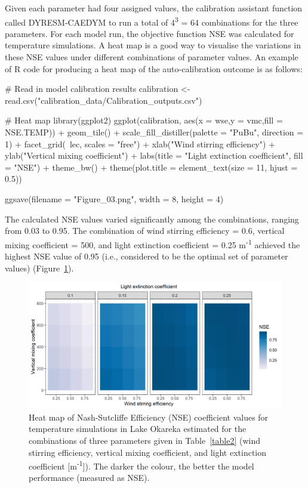 Given each parameter had four assigned values, the calibration assistant function called DYRESM-CAEDYM to run a total of 4\textsuperscript{3} = 64 combinations for the three parameters. For each model run, the objective function NSE was calculated for temperature simulations. A heat map is a good way to visualise the variations in these NSE values under different combinations of parameter values. An example of R code for producing a heat map of the auto-calibration outcome is as follows:

\begin{example}
    # Read in model calibration results
    calibration <- read.csv("calibration_data/Calibration_outputs.csv")

    # Heat map
    library(ggplot2)
    ggplot(calibration, aes(x = wse,y = vmc,fill = NSE.TEMP)) +
           geom_tile() +
           scale_fill_distiller(palette = "PuBu", direction = 1) +
           facet_grid(~lec, scales = "free") +
           xlab("Wind stirring efficiency") +
           ylab("Vertical mixing coefficient") +
           labs(title = "Light extinction coefficient", fill = "NSE") +
           theme_bw()  +
           theme(plot.title = element_text(size = 11, hjust = 0.5))
           
    ggsave(filename = "Figure_03.png", width = 8, height = 4)
\end{example}

The calculated NSE values varied significantly among the combinations, ranging from 0.03 to 0.95. The combination of wind stirring efficiency = 0.6, vertical mixing coefficient = 500, and light extinction coefficient = 0.25 m\textsuperscript{-1} achieved the highest NSE value of 0.95 (i.e., considered to be the optimal set of parameter values) (Figure~\ref{figure3}). 

\begin{figure}[ht]
    \centering
    \includegraphics[scale = 0.62]{Figure3}
    \caption{Heat map of Nash-Sutcliffe Efficiency (NSE) coefficient values for temperature simulations in Lake Okareka estimated for the combinations of three parameters given in Table~\ref{table2} (wind stirring efficiency, vertical mixing coefficient, and light extinction coefficient [m\textsuperscript{-1}]). The darker the colour, the better the model performance (measured as NSE).}
    \label{figure3}
\end{figure}

